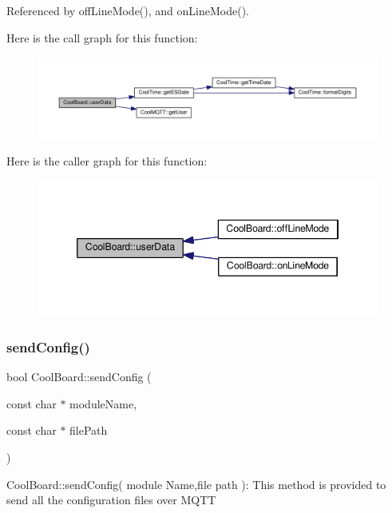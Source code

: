 Referenced by off\+Line\+Mode(), and on\+Line\+Mode().

Here is the call graph for this function\+:
\nopagebreak
\begin{figure}[H]
\begin{center}
\leavevmode
\includegraphics[width=350pt]{d7/df9/class_cool_board_ae7358fb6e623cfc81b775f5f1734909b_cgraph}
\end{center}
\end{figure}
Here is the caller graph for this function\+:
\nopagebreak
\begin{figure}[H]
\begin{center}
\leavevmode
\includegraphics[width=346pt]{d7/df9/class_cool_board_ae7358fb6e623cfc81b775f5f1734909b_icgraph}
\end{center}
\end{figure}
\mbox{\label{class_cool_board_a705398b11560603fcdd1b9e8e95d0027}} 
\subsubsection{\texorpdfstring{send\+Config()}{sendConfig()}}
{\footnotesize\ttfamily bool Cool\+Board\+::send\+Config (\begin{DoxyParamCaption}\item[{const char $\ast$}]{module\+Name,  }\item[{const char $\ast$}]{file\+Path }\end{DoxyParamCaption})}

Cool\+Board\+::send\+Config( module Name,file path )\+: This method is provided to send all the configuration files over M\+Q\+TT

